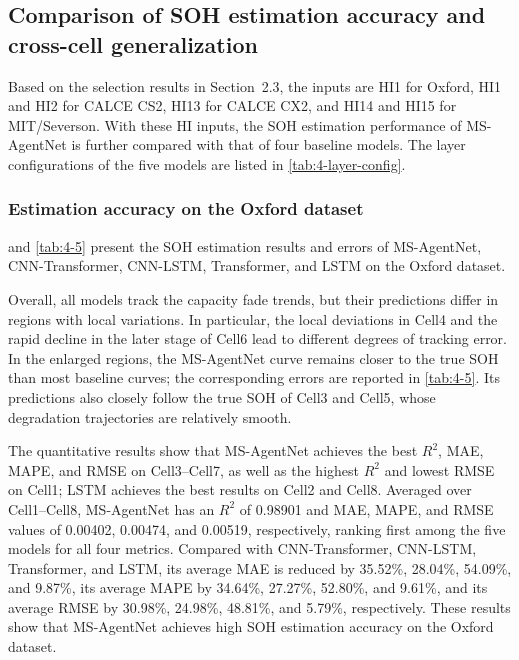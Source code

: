 \subsection{Comparison of SOH estimation accuracy and cross-cell generalization}

Based on the selection results in Section~2.3, the inputs are HI1 for Oxford, HI1 and HI2 for CALCE CS2, HI13 for CALCE CX2, and HI14 and HI15 for MIT/Severson. With these HI inputs, the SOH estimation performance of MS-AgentNet is further compared with that of four baseline models. The layer configurations of the five models are listed in \cref{tab:4-layer-config}.


\FloatBarrier


\subsubsection{Estimation accuracy on the Oxford dataset}

 and \cref{tab:4-5} present the SOH estimation results and errors of MS-AgentNet, CNN-Transformer, CNN-LSTM, Transformer, and LSTM on the Oxford dataset.



Overall, all models track the capacity fade trends, but their predictions differ in regions with local variations. In particular, the local deviations in Cell4 and the rapid decline in the later stage of Cell6 lead to different degrees of tracking error. In the enlarged regions, the MS-AgentNet curve remains closer to the true SOH than most baseline curves; the corresponding errors are reported in \cref{tab:4-5}. Its predictions also closely follow the true SOH of Cell3 and Cell5, whose degradation trajectories are relatively smooth.

The quantitative results show that MS-AgentNet achieves the best $R^2$, MAE, MAPE, and RMSE on Cell3--Cell7, as well as the highest $R^2$ and lowest RMSE on Cell1; LSTM achieves the best results on Cell2 and Cell8. Averaged over Cell1--Cell8, MS-AgentNet has an $R^2$ of 0.98901 and MAE, MAPE, and RMSE values of 0.00402, 0.00474, and 0.00519, respectively, ranking first among the five models for all four metrics. Compared with CNN-Transformer, CNN-LSTM, Transformer, and LSTM, its average MAE is reduced by 35.52\%, 28.04\%, 54.09\%, and 9.87\%, its average MAPE by 34.64\%, 27.27\%, 52.80\%, and 9.61\%, and its average RMSE by 30.98\%, 24.98\%, 48.81\%, and 5.79\%, respectively. These results show that MS-AgentNet achieves high SOH estimation accuracy on the Oxford dataset.

